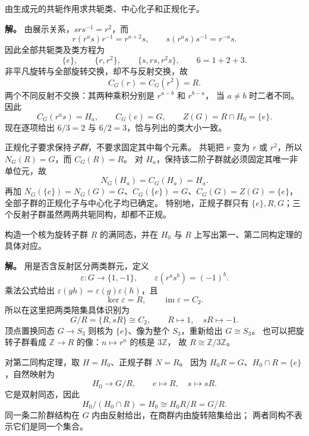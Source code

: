 \begin{workedexample}
\label{ex:d3-comprehensive-conjugacy}
由生成元的共轭作用求共轭类、中心化子和正规化子。

\textbf{解。} 由展示关系，$srs^{-1}=r^2$，而
\[
r(r^a s)r^{-1}=r^{a+2}s,\qquad
s(r^a s)s^{-1}=r^{-a}s.
\]
因此全部共轭类及类方程为
\[
\{e\},\qquad \{r,r^2\},\qquad \{s,rs,r^2s\},
\qquad 6=1+2+3.
\]
非平凡旋转与全部旋转交换，却不与反射交换，故
\[
C_G(r)=C_G(r^2)=R.
\]
两个不同反射不交换：其两种乘积分别是 $r^{a-b}$ 和 $r^{b-a}$，
当 $a\ne b$ 时二者不同。因此
\[
C_G(r^a s)=H_a,\qquad C_G(e)=G,
\qquad Z(G)=R\cap H_0=\{e\}.
\]
现在逐项给出 $6/3=2$ 与 $6/2=3$，恰与列出的类大小一致。

正规化子要求保持\emph{子群}，不要求固定其中每个元素。
共轭把 $r$ 变为 $r$ 或 $r^2$，所以 $N_G(R)=G$，而 $C_G(R)=R$。
对 $H_a$，保持该二阶子群就必须固定其唯一非单位元，故
\[
N_G(H_a)=C_G(H_a)=H_a.
\]
再加 $N_G(\{e\})=N_G(G)=G$、$C_G(\{e\})=G$、$C_G(G)=Z(G)=\{e\}$，
全部子群的正规化子与中心化子均已确定。
特别地，正规子群只有 $\{e\},R,G$；三个反射子群虽然两两共轭同构，却都不正规。
\end{workedexample}

\begin{workedexample}
\label{ex:d3-comprehensive-isomorphism}
构造一个核为旋转子群 $R$ 的满同态，并在 $H_0$ 与 $R$ 上写出第一、第二同构定理的具体对应。

\textbf{解。} 用是否含反射区分两类群元，定义
\[
\varepsilon:G\longrightarrow\{1,-1\},\qquad
\varepsilon(r^a s^b)=(-1)^b.
\]
乘法公式给出 $\varepsilon(gh)=\varepsilon(g)\varepsilon(h)$，且
\[
\ker\varepsilon=R,\qquad\operatorname{im}\varepsilon=C_2.
\]
所以在这里把两类陪集具体识别为
\[
G/R=\{R,sR\}\cong C_2,\qquad R\mapsto1,\quad sR\mapsto-1.
\]
顶点置换同态 $G\to S_3$ 则核为 $\{e\}$、像为整个 $S_3$，重新给出 $G\cong S_3$。
也可以把旋转子群看成 $\mathbb Z\to R$ 的像：$n\mapsto r^n$ 的核是 $3\mathbb Z$，
故 $R\cong\mathbb Z/3\mathbb Z$。

对第二同构定理，取 $H=H_0$、正规子群 $N=R$。
因为 $H_0R=G$、$H_0\cap R=\{e\}$，自然映射为
\[
H_0\longrightarrow G/R,\qquad e\mapsto R,\quad s\mapsto sR.
\]
它是双射同态，因此
\[
H_0/(H_0\cap R)=H_0\cong H_0R/R=G/R.
\]
同一条二阶群结构在 $G$ 内由反射给出，在商群内由旋转陪集给出；
两者同构不表示它们是同一个集合。
\end{workedexample}


